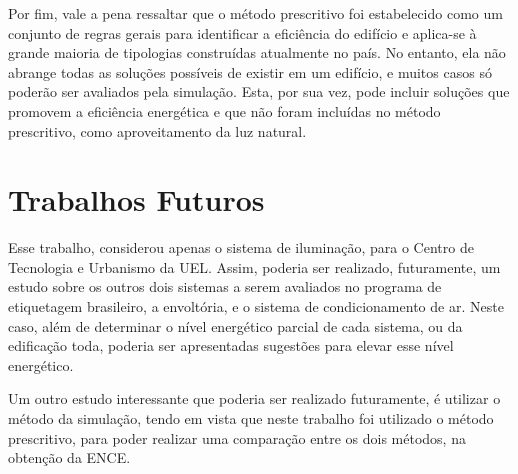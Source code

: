 Por fim, vale a pena ressaltar que o método prescritivo foi estabelecido como um conjunto de regras gerais para identificar a eficiência do
edifício e aplica-se à grande maioria de tipologias construídas atualmente no país. No entanto, ela não abrange todas as soluções possíveis de existir
em um edifício, e muitos casos só poderão ser avaliados pela simulação. Esta, por sua vez, pode incluir soluções que promovem a eficiência
energética e que não foram incluídas no método prescritivo, como aproveitamento da luz natural.



\vspace{-0.5cm}

\section{Trabalhos Futuros}

Esse trabalho, considerou apenas o sistema de iluminação, para o Centro de Tecnologia e Urbanismo da UEL. Assim, poderia ser realizado, futuramente, um estudo sobre os outros dois sistemas a serem avaliados no programa de etiquetagem brasileiro, a envoltória, e o sistema de condicionamento de ar. Neste caso, além de determinar o nível energético parcial de cada sistema, ou da edificação toda, poderia ser apresentadas sugestões para elevar esse nível energético.

Um outro estudo interessante que poderia ser realizado futuramente, é utilizar o método da simulação, tendo em vista que neste trabalho foi utilizado o método prescritivo, para poder realizar uma comparação entre os dois métodos, na obtenção da ENCE. 

